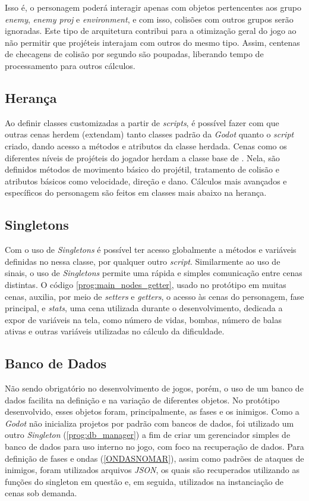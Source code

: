 Isso é, o personagem poderá interagir apenas com objetos pertencentes aos grupo \textit{enemy}, \textit{enemy proj} e \textit{environment}, e com isso, colisões com outros grupos serão ignoradas. Este tipo de arquitetura contribui para a otimização geral do jogo ao não permitir que projéteis interajam com outros do mesmo tipo. Assim, centenas de checagens de colisão por segundo são poupadas, liberando tempo de processamento para outros cálculos.

\subsection{Herança}

Ao definir classes customizadas a partir de \textit{scripts}, é possível fazer com que outras cenas herdem (extendam) tanto classes padrão da \textit{Godot} quanto o \textit{script} criado, dando acesso a métodos e atributos da classe herdada. Cenas como os diferentes níveis de projéteis do jogador herdam a classe base de \textquotedbl{}. Nela, são definidos métodos de movimento básico do projétil, tratamento de colisão e atributos básicos como velocidade, direção e dano. Cálculos mais avançados e específicos do personagem são feitos em classes mais abaixo na herança.

\subsection{Singletons}\label{sec:Singletons}

Com o uso de \textit{Singletons} é possível ter acesso globalmente a métodos e variáveis definidas no nessa classe, por qualquer outro \textit{script}. Similarmente ao uso de sinais, o uso de \textit{Singletons} permite uma rápida e simples comunicação entre cenas distintas. O código \ref{prog:main_nodes_getter}, usado no protótipo em muitas cenas, auxilia, por meio de \textit{setters} e \textit{getters}, o acesso às cenas do personagem, fase principal, e \textit{stats}, uma cena utilizada durante o desenvolvimento, dedicada a expor de variáveis na tela, como número de vidas, bombas, número de balas ativas e outras variáveis utilizadas no cálculo da dificuldade.

\subsection{Banco de Dados}

Não sendo obrigatório no desenvolvimento de jogos, porém, o uso de um banco de dados facilita na definição e na variação de diferentes objetos. No protótipo desenvolvido, esses objetos foram, principalmente, as fases e os inimigos. Como a \textit{Godot} não inicializa projetos por padrão com bancos de dados, foi utilizado um outro \textit{Singleton} (\ref{prog:db_manager}) a fim de criar um gerenciador simples de banco de dados para uso interno no jogo, com foco na recuperação de dados. Para definição de fases e ondas (\ref{ONDASNOMAR}), assim como padrões de ataques de inimigos, foram utilizados arquivos \textit{JSON}, os quais são recuperados utilizando as funções do singleton em questão e, em seguida, utilizados na instanciação de cenas sob demanda.

